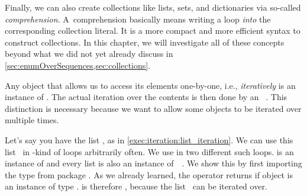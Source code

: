 Finally, we can also create collections like lists, sets, and dictionaries via so-called \emph{comprehension}.
A~comprehension basically means writing a  loop \emph{into} the corresponding collection literal.
It is a more compact and more efficient syntax to construct collections.
In this chapter, we will investigate all of these concepts beyond what we did not yet already discuss in \cref{sec:enumOverSequences,sec:collections}.%
%
%
\label{sec:iterable}%
%
%
%
%
%
%
%
%
%
%
%
%
%
\begin{sloppypar}%
Any object that allows us to access its elements one-by-one, i.e., \emph{iteratively} is an instance of .
The actual iteration over the contents is then done by an ~\cite{PEP234,PSF:P3D:TPSL:BIT:IT,PSF:P3D:G:I2}.
This distinction is necessary because we want to allow some objects to be iterated over multiple times.%
\end{sloppypar}%
%
Let's say you have the list , as in \cref{exec:iteration:list_iteration}.
We can use this list~ in -kind of loops arbitrarily often.
We use  in two different such  loops.
 is an instance of  and every list is also an instance
of~~\cite{PSF:P3D:G:I1}.
We show this by first importing the type  from package .
As we already learned, the operator  returns  if object  is an instance of type .
 is therefore , because the list~ can be iterated over.

